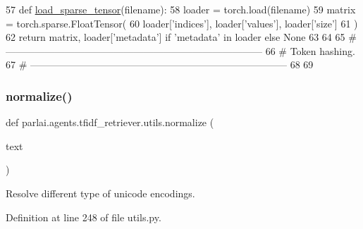 \begin{DoxyCode}
57 \textcolor{keyword}{def }\hyperlink{namespaceparlai_1_1agents_1_1tfidf__retriever_1_1utils_a28faf0af977db4915cf5253d69d37c0d}{load\_sparse\_tensor}(filename):
58     loader = torch.load(filename)
59     matrix = torch.sparse.FloatTensor(
60         loader[\textcolor{stringliteral}{'indices'}], loader[\textcolor{stringliteral}{'values'}], loader[\textcolor{stringliteral}{'size'}]
61     )
62     \textcolor{keywordflow}{return} matrix, loader[\textcolor{stringliteral}{'metadata'}] \textcolor{keywordflow}{if} \textcolor{stringliteral}{'metadata'} \textcolor{keywordflow}{in} loader \textcolor{keywordflow}{else} \textcolor{keywordtype}{None}
63 
64 
65 \textcolor{comment}{# ------------------------------------------------------------------------------}
66 \textcolor{comment}{# Token hashing.}
67 \textcolor{comment}{# ------------------------------------------------------------------------------}
68 
69 
\end{DoxyCode}
\mbox{\label{namespaceparlai_1_1agents_1_1tfidf__retriever_1_1utils_ace97d2139f74e163a7ba81fcfb505f1c}} 
\subsubsection{\texorpdfstring{normalize()}{normalize()}}
{\footnotesize\ttfamily def parlai.\+agents.\+tfidf\+\_\+retriever.\+utils.\+normalize (\begin{DoxyParamCaption}\item[{}]{text }\end{DoxyParamCaption})}

\begin{DoxyVerb}Resolve different type of unicode encodings.
\end{DoxyVerb}
 

Definition at line 248 of file utils.\+py.


